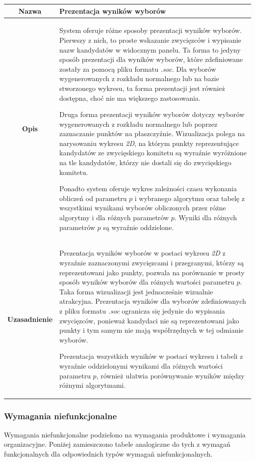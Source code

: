 \documentclass[polish,11pt]{aghthesis}
\begin{document}
\begin{table}
\centering
\begin{tabular}{|c|p{10cm}|}
\hline
\textbf{Nazwa} & Prezentacja wyników wyborów \\ 
\hline 
\textbf{Opis} & System oferuje różne sposoby prezentacji wyników wyborów. Pierwszy z
nich, to proste wskazanie zwycięzców i wypisanie nazw kandydatów w
widocznym panelu. Ta forma to jedyny sposób prezentacji dla wyników wyborów,
które zdefiniowane zostały za pomocą pliku formatu \textit{.soc}. Dla wyborów wygenerowanych z rozkładu normalnego lub na bazie stworzonego wykresu, ta forma prezentacji jest również dostępna, choć nie ma większego zastosowania.

Druga forma prezentacji wyników wyborów dotyczy wyborów wygenerowanych z
rozkładu normalnego lub poprzez zaznaczanie punktów na płaszczyźnie.
Wizualizacja polega na narysowaniu wykresu
\textit{2D}, na którym punkty reprezentujące kandydatów ze zwycięskiego
komitetu są wyraźnie wyróżnione na tle kandydatów, którzy nie dostali
się do zwycięskiego komitetu. 

Ponadto system oferuje wykres zależności czasu wykonania obliczeń od parametru $p$ i 
wybranego algorytmu oraz tabelę z wszystkimi wynikami wyborów obliczonych przez różne algorytmy i dla 
różnych parametrów $p$. Wyniki dla różnych parametrów $p$ są wyraźnie oddzielone.\\ 
\hline 
\textbf{Uzasadnienie} & Prezentacja wyników wyborów w postaci wykresu \textit{2D} z wyraźnie
zaznaczonymi zwycięzcami i przegranymi, którzy są reprezentowani
jako punkty, pozwala na porównanie w prosty sposób wyników
wyborów dla różnych wartości parametru $p$. Taka forma wizualizacji
jest jednocześnie wizualnie atrakcyjna.
Prezentacja wyników dla wyborów zdefiniowanych z pliku formatu \textit{.soc}
ogranicza się jedynie do wypisania zwycięzców, ponieważ kandydaci
nie są reprezentowani jako punkty i tym samym nie mają
współrzędnych w tej odmianie wyborów.

Prezentacja wszystkich wyników w postaci wykresu i tabeli z wyraźnie oddzielonymi wynikami dla różnych wartości parametru $p$, również ułatwia porównywanie wyników między różnymi algorytmami.\\ 
\hline 
\end{tabular} 
\end{table}

\clearpage
\subsubsection{Wymagania niefunkcjonalne}
Wymagania niefunkcjonalne podzielono na wymagania produktowe i wymagania organizacyjne. Poniżej zamieszczono tabele analogiczne do tych z wymagań funkcjonalnych dla odpowiednich typów wymagań niefunkcjonalnych.
\end{document}
